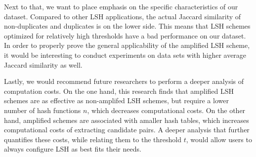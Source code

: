 Next to that, we want to place emphasis on the specific characteristics of our dataset. Compared to other LSH applications, the actual Jaccard similarity of non-duplicates and duplicates is on the lower side. This means that LSH schemes optimized for relatively high thresholds have a bad performance on our dataset. In order to properly prove the general applicability of the amplified LSH scheme, it would be interesting to conduct experiments on data sets with higher average Jaccard similarity as well.  

Lastly, we would recommend future researchers to perform a deeper analysis of computation costs. On the one hand, this research finds that amplified LSH schemes are as effective as non-amplifed LSH schemes, but require a lower number of hash functions $n$, which decreases computational costs. On the other hand, amplified schemes are associated with amaller hash tables, which increases computational costs of extracting candidate pairs. A deeper analysis that further quantifies these costs, while relating them to the threshold $t$, would allow users to always configure LSH as best fits their needs. 




